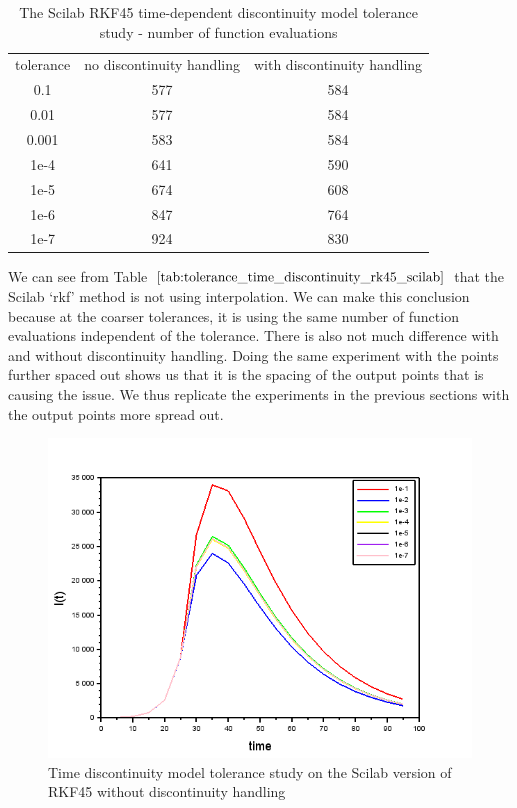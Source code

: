 \begin{table}[H]
\caption {The Scilab RKF45 time-dependent discontinuity model tolerance study - number of function evaluations} 
\label{tab:tolerance_time_discontinuity_rk45_scilab} 
\begin{center}
\begin{tabular}{ c c c }
tolerance & no discontinuity handling & with discontinuity handling\\ 
0.1 & 577 & 584 \\
0.01 & 577 & 584 \\
0.001 & 583 & 584 \\
1e-4 & 641 & 590 \\
1e-5 & 674 & 608 \\
1e-6 & 847 & 764 \\
1e-7 & 924 & 830 \\
\end{tabular}
\end{center}
\end{table}
We can see from Table $\ref{tab:tolerance_time_discontinuity_rk45_scilab}$ that the Scilab `rkf' method is not using interpolation. We can make this conclusion because at the coarser tolerances, it is using the same number of function evaluations independent of the tolerance. There is also not much difference with and without discontinuity handling. Doing the same experiment with the points further spaced out shows us that it is the spacing of the output points that is causing the issue. We thus replicate the experiments in the previous sections with the output points more spread out.
\begin{figure}[H]
\centering
\includegraphics[width=0.7\linewidth]{./figures/tolerance_time_rkf_further_no_event_sci}
\caption{Time discontinuity model tolerance study on the Scilab version of RKF45 without discontinuity handling}
\label{fig:tolerance_time_rkf_further_no_event_sci}
\end{figure}

